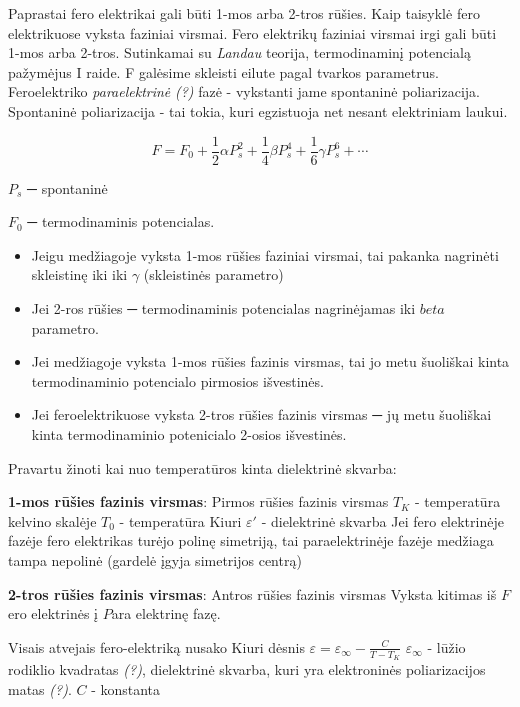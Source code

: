 Paprastai fero elektrikai gali būti 1-mos arba 2-tros rūšies.
Kaip taisyklė fero elektrikuose vyksta faziniai virsmai.
Fero elektrikų faziniai virsmai irgi gali būti 1-mos arba 2-tros.
Sutinkamai su \textit{Landau} teorija, termodinaminį potencialą pažymėjus
I raide. F galėsime skleisti eilute pagal tvarkos parametrus.
Feroelektriko \textit{paraelektrinė} \textit{(?)} fazė - vykstanti jame spontaninė poliarizacija.
Spontaninė poliarizacija - tai tokia, kuri egzistuoja net nesant elektriniam
laukui.

\begin{equation*}
  F = F_0 + \frac{1}{2}\alpha P_s^2 +
  \frac{1}{4}\beta P_s^4 + \frac{1}{6}\gamma P_s^6 + \cdots
\end{equation*}

$P_s$ ─ spontaninė

$F_0$ ─ termodinaminis potencialas.

\begin{itemize}
  \item Jeigu medžiagoje vyksta 1-mos rūšies faziniai virsmai,
  tai pakanka nagrinėti skleistinę iki iki $\gamma$ (skleistinės parametro)
  \item Jei 2-ros rūšies ─ termodinaminis potencialas nagrinėjamas iki $beta$
  parametro.
\end{itemize}

\begin{itemize}
  \item Jei medžiagoje vyksta 1-mos rūšies fazinis virsmas,
  tai jo metu šuoliškai kinta termodinaminio potencialo pirmosios išvestinės.
  \item Jei feroelektrikuose vyksta 2-tros rūšies fazinis virsmas
  ─ jų metu šuoliškai kinta termodinaminio potenicialo 2-osios išvestinės.
\end{itemize}

Pravartu žinoti kai nuo temperatūros kinta dielektrinė skvarba:

\textbf{1-mos rūšies fazinis virsmas}:
{Pirmos rūšies fazinis virsmas}
$T_K$ - temperatūra kelvino skalėje
$T_0$ - temperatūra Kiuri
$\varepsilon'$ - dielektrinė skvarba
Jei fero elektrinėje fazėje fero elektrikas turėjo polinę simetriją,
tai paraelektrinėje fazėje medžiaga tampa nepolinė
(gardelė įgyja simetrijos centrą)

\textbf{2-tros rūšies fazinis virsmas}:
{Antros rūšies fazinis virsmas}
Vyksta kitimas iš $F$ero elektrinės į $P$ara elektrinę fazę.

Visais atvejais fero-elektriką nusako Kiuri dėsnis
$\varepsilon = \varepsilon_{\infty} - \frac{C}{T - T_K}$
$\varepsilon_{\infty}$ - lūžio rodiklio kvadratas \textit{(?)},
dielektrinė skvarba, kuri yra elektroninės poliarizacijos matas \textit{(?)}.
$C$ - konstanta

